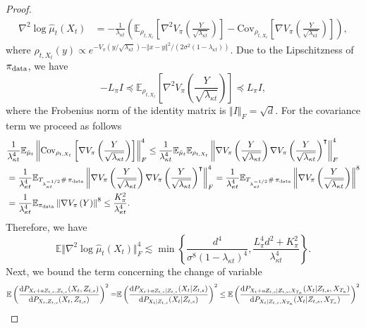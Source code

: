 \begin{proof}
\begin{align*}
    \nabla^2 \log \hat{\mu}_t(X_t) &=-\frac{1}{\lambda_{\kappa t}}\left(\mathbb{E}_{\rho_{t, X_t}}\left[\nabla^2 V_\pi\left(\frac{Y}{\sqrt{\lambda_{\kappa t}}}\right)\right] - \text{Cov}_{\rho_{t, X_t}}\left[\nabla V_\pi\left(\frac{Y}{\sqrt{\lambda_{\kappa t}}}\right)\right]\right),
\end{align*}
where $\rho_{t, X_t}(y)\propto e^{-V_\pi(y/\sqrt{\lambda_{\kappa t}})-\Vert x-y\Vert^2/(2\sigma^2(1-\lambda_{\kappa t}))}$.
Due to the Lipschitzness of $\operatorname*{\pi_{\text{data}}}$, we have
\begin{equation*}
    - L_\pi I \preccurlyeq\mathbb{E}_{\rho_{t, X_t}}\left[\nabla^2 V_\pi\left(\frac{Y}{\sqrt{\lambda_{\kappa t}}}\right)\right]\preccurlyeq L_\pi I,
\end{equation*}
where the Frobenius norm of the identity matrix is $\Vert I\Vert_F=\sqrt{d}$.
For the covariance term we proceed as follows
\begin{align*}
    &\frac{1}{\lambda_{\kappa t}^4}\mathbb{E}_{\hat{\mu}_t} \left\Vert \text{Cov}_{\rho_{t, X_t}}\left[\nabla V_\pi\left(\frac{Y}{\sqrt{\lambda_{\kappa t}}}\right)\right]\right\Vert_F^4 \leq \frac{1}{\lambda_{\kappa t}^4} \mathbb{E}_{\hat{\mu}_t}\mathbb{E}_{\rho_{t,X_t}} \left\Vert\nabla V_\pi\left(\frac{Y}{\sqrt{\lambda_{\kappa t}}}\right) \nabla V_\pi\left(\frac{Y}{\sqrt{\lambda_{\kappa t}}}\right)^\intercal\right\Vert_F^4\\
    &= \frac{1}{\lambda_{\kappa t}^4} \mathbb{E}_{T_{\lambda_{\kappa t}^{-1/2}}\#\operatorname*{\pi_{\text{data}}}} \left\Vert\nabla V_\pi\left(\frac{Y}{\sqrt{\lambda_{\kappa t}}}\right) \nabla V_\pi\left(\frac{Y}{\sqrt{\lambda_{\kappa t}}}\right)^\intercal\right\Vert_F^4 = \frac{1}{\lambda_{\kappa t}^4}  \mathbb{E}_{T_{\lambda_{\kappa t}^{-1/2}}\#\operatorname*{\pi_{\text{data}}}} \left\Vert\nabla V_\pi\left(\frac{Y}{\sqrt{\lambda_{\kappa t}}}\right)\right\Vert^{8} \\
    & =\frac{1}{\lambda_{\kappa t}^4}  \mathbb{E}_{\operatorname*{\pi_{\text{data}}}} \left\Vert\nabla V_\pi\left(Y\right)\right\Vert^{8} \leq \frac{K_\pi^2}{\lambda_{\kappa t}^4}.
\end{align*}
Therefore, we have
\begin{equation*}
    \mathbb{E}\Vert \nabla^2\log \hat{\mu}_t(X_t)\Vert_F^4 \lesssim \min \left\{\frac{d^4}{\sigma^8(1-\lambda_{\kappa t})^4}, \frac{L_\pi^4 d^2 + K_\pi^2}{\lambda_{\kappa t}^4}\right\}.
\end{equation*}
Next, we bound the term concerning the change of variable
\begin{align*}
    \mathbb{E}\left(\frac{\md P_{X_t + a Z_{t,s}, Z_{t,s}}(X_t, Z_{t,s})}{\md P_{X_t, Z_{t,s}}(X_t, Z_{t,s})}\right)^2 =& \mathbb{E}\left(\frac{\md P_{X_t + a Z_{t,s}| Z_{t,s}}(X_t| Z_{t,s})}{\md P_{X_t | Z_{t,s}}(X_t| Z_{t,s})}\right)^2 \leq \mathbb{E}\left(\frac{\md P_{X_t + a Z_{t,s}| Z_{t,s}, X_{T_{\kappa}}}(X_t| Z_{t,s}, X_{T_{\kappa}})}{\md P_{X_t | Z_{t,s}, X_{T_{\kappa}}}(X_t| Z_{t,s}, X_{T_{\kappa}})}\right)^2\\

\end{align*}
\end{proof}
